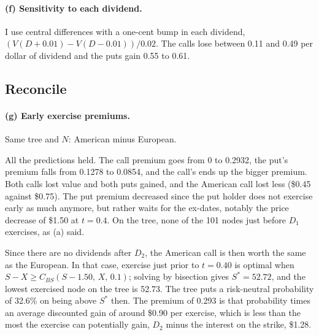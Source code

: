 \documentclass[11pt]{article}
\newcommand{\tbl}[1]{}
\begin{document}
\begin{table}[H]
\centering\small
\caption{Central-difference delta and gamma of the American options with dividends, $N=500$.}
\label{tab:p2greeks}
\tbl{p2_greeks}
\end{table}

\paragraph{(f) Sensitivity to each dividend.} I use central differences with a one-cent bump in each dividend, $(V(D+0.01)-V(D-0.01))/0.02$. The calls lose between 0.11 and 0.49 per dollar of dividend and the puts gain 0.55 to 0.61.

\begin{table}[H]
\centering\small
\caption{Change in value per \$1 of each dividend, $N=500$.}
\label{tab:p2sens}
\tbl{p2_div_sens}
\end{table}

\subsection*{Reconcile}

\paragraph{(g) Early exercise premiums.} Same tree and $N$: American minus European.

\begin{table}[H]
\centering\small
\caption{Early exercise premium, $N=500$.}
\tbl{p2_premium}
\end{table}

All the predictions held. The call premium goes from 0 to 0.2932, the put's premium falls from 0.1278 to 0.0854, and the call's ends up the bigger premium. Both calls lost value and both puts gained, and the American call lost less (\$0.45 against \$0.75). The put premium decreased since the put holder does not exercise early as much anymore, but rather waits for the ex-dates, notably the price decrease of \$1.50 at $t=0.4$. On the tree, none of the 101 nodes just before $D_1$ exercises, as (a) said.

Since there are no dividends after $D_2$, the American call is then worth the same as the European. In that case, exercise just prior to $t=0.40$ is optimal when $S-X\ge C_{BS}(S-1.50,\,X,\,0.1)$; solving by bisection gives $S^*=52.72$, and the lowest exercised node on the tree is 52.73. The tree puts a risk-neutral probability of 32.6\% on being above $S^*$ then. The premium of 0.293 is that probability times an average discounted gain of around \$0.90 per exercise, which is less than the most the exercise can potentially gain, $D_2$ minus the interest on the strike, \$1.28.
\end{document}
